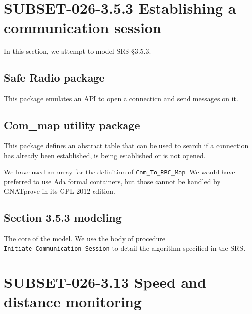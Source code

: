 \documentclass{template/openetcs_report}
\newcommand{\Ada}[1]{\lstinline[language=Ada,basicstyle={\sffamily},framesep=0pt]{#1}}
\begin{document}




\section{SUBSET-026-3.5.3 Establishing a communication session}

In this section, we attempt to model SRS §3.5.3.

\subsection{Safe Radio package}

This package emulates an API to open a connection and send messages on
it.




\subsection{Com\_map utility package}

This package defines an abstract table that can be used to search if a
connection has already been established, is being established or is
not opened.

We have used an array for the definition of \Ada{Com_To_RBC_Map}. We
would have preferred to use Ada formal containers, but those cannot be
handled by GNATprove in its GPL 2012 edition.



\subsection{Section 3.5.3 modeling}

The core of the model. We use the body of procedure
\Ada{Initiate_Communication_Session} to detail the algorithm specified
in the SRS.





\section{SUBSET-026-3.13 Speed and distance monitoring}
\end{document}
